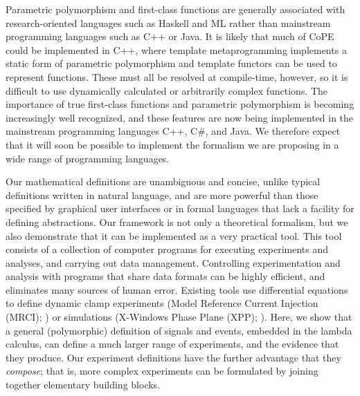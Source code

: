 Parametric polymorphism and first-class functions are generally
associated with research-oriented languages such as Haskell and ML
rather than mainstream programming languages such as C++ or Java. It
is likely that much of CoPE could be implemented in C++, where
template metaprogramming implements a static form of parametric
polymorphism and template functors can be used to represent
functions. These must all be resolved at compile-time, however, so it
is difficult to use dynamically calculated or arbitrarily complex
functions. The importance of true first-class functions and parametric
polymorphism is becoming increasingly well recognized, and these
features are now being implemented in the mainstream programming
languages C++, C\#, and Java. We therefore expect that it will
soon be possible to implement the formalism we are proposing in a wide
range of programming languages.

%
% 
%
Our mathematical definitions are unambiguous and concise, unlike
typical definitions written in natural language, and are more powerful
than those specified by graphical user interfaces or in formal
languages that lack a facility for defining abstractions. Our
framework is not only a theoretical formalism, but we also demonstrate
that it can be implemented as a very practical tool. This tool
consists of a collection of computer programs for executing
experiments and analyses, and carrying out data
management. Controlling experimentation and analysis with programs
that share data formats can be highly efficient, and eliminates many
sources of human error. Existing tools use differential equations to
define dynamic clamp experiments (Model Reference Current Injection
(MRCI); \citep{Raikov2004}) or simulations (X-Windows Phase Plane
(XPP); \citep{Ermentrout1987}). Here, we show that a general
(polymorphic) definition of signals and events, embedded in the lambda
calculus, can define a much larger range of experiments, and the
evidence that they produce. Our experiment definitions have the
further advantage that they \emph{compose}; that is, more complex
experiments can be formulated by joining together elementary building
blocks.

